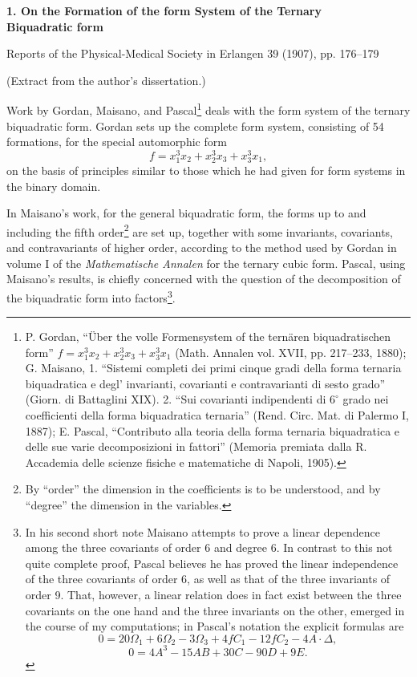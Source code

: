 \documentclass[11pt]{article}
\begin{document}
\begin{center}
{\Large\bfseries 1. On the Formation of the form System of the Ternary\\ Biquadratic form}\par
\vspace{1.5em}
Reports of the Physical-Medical Society in Erlangen 39 (1907), pp. 176--179
\end{center}

\vspace{4em}
\begin{center}
(Extract from the author's dissertation.)
\end{center}

Work by Gordan, Maisano, and Pascal\footnote{P. Gordan, ``Über the volle Formensystem of the ternären biquadratischen form'' $f=x_1^3x_2+x_2^3x_3+x_3^3x_1$ (Math. Annalen vol. XVII, pp. 217--233, 1880); G. Maisano, 1. ``Sistemi completi dei primi cinque gradi della forma ternaria biquadratica e degl' invarianti, covarianti e contravarianti di sesto grado'' (Giorn. di Battaglini XIX). 2. ``Sui covarianti indipendenti di $6^\circ$ grado nei coefficienti della forma biquadratica ternaria'' (Rend. Circ. Mat. di Palermo I, 1887); E. Pascal, ``Contributo alla teoria della forma ternaria biquadratica e delle sue varie decomposizioni in fattori'' (Memoria premiata dalla R. Accademia delle scienze fisiche e matematiche di Napoli, 1905).} deals with the form system of the ternary biquadratic form. Gordan sets up the complete form system, consisting of 54 formations, for the special automorphic form
\[
f=x_1^3x_2+x_2^3x_3+x_3^3x_1,
\]
on the basis of principles similar to those which he had given for form systems in the binary domain.

In Maisano's work, for the general biquadratic form, the forms up to and including the fifth order\footnote{By ``order'' the dimension in the coefficients is to be understood, and by ``degree'' the dimension in the variables.} are set up, together with some invariants, covariants, and contravariants of higher order, according to the method used by Gordan in volume I of the \emph{Mathematische Annalen} for the ternary cubic form. Pascal, using Maisano's results, is chiefly concerned with the question of the decomposition of the biquadratic form into factors\footnote{In his second short note Maisano attempts to prove a linear dependence among the three covariants of order 6 and degree 6. In contrast to this not quite complete proof, Pascal believes he has proved the linear independence of the three covariants of order 6, as well as that of the three invariants of order 9. That, however, a linear relation does in fact exist between the three covariants on the one hand and the three invariants on the other, emerged in the course of my computations; in Pascal's notation the explicit formulas are
\[
0=20\Omega_1+6\Omega_2-3\Omega_3+4fC_1-12fC_2-4A\cdot\Delta,
\]
\[
0=4A^3-15AB+30C-90D+9E.
\]}.
\end{document}
